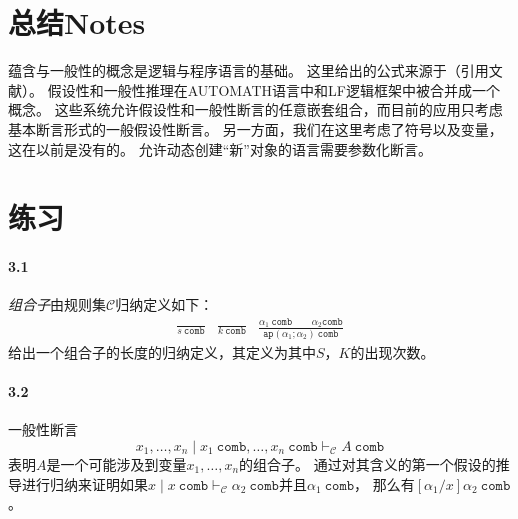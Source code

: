 \section{总结Notes}

蕴含与一般性的概念是逻辑与程序语言的基础。
这里给出的公式来源于（引用文献）。
假设性和一般性推理在AUTOMATH语言中和LF逻辑框架中被合并成一个概念。
这些系统允许假设性和一般性断言的任意嵌套组合，而目前的应用只考虑基本断言形式的一般假设性断言。
另一方面，我们在这里考虑了符号以及变量，这在以前是没有的。
允许动态创建“新”对象的语言需要参数化断言。

\section*{练习}

\paragraph{3.1} 
\textit{组合子}由规则集$\mathcal{C}$归纳定义如下：
\begin{subequations}
    \begin{align}
        \frac{}{s \ \mathtt{comb}} 
    \end{align}
    \begin{align}
        \frac{}{k \ \mathtt{comb}} 
    \end{align}
    \begin{align}
        \frac{\alpha_1 \ \mathtt{comb} \qquad \alpha_2 \mathtt{comb}}{\mathtt{ap}(\alpha_1 ; \alpha_2) \ \mathtt{comb}} 
    \end{align}
\end{subequations}
给出一个组合子的长度的归纳定义，其定义为其中$S$，$K$的出现次数。

\paragraph{3.2} 
一般性断言
$$x_1, \dots, x_n \mid x_1 \ \mathtt{comb}, \dots, x_n \ \mathtt{comb} \vdash_{\mathcal{C}} A \ \mathtt{comb}$$
表明$A$是一个可能涉及到变量$x_1,\dots,x_n$的组合子。
通过对其含义的第一个假设的推导进行归纳来证明如果$x \mid x \ \mathtt{comb} \vdash_{\mathcal{C}} \alpha_2 \ \mathtt{comb}$并且$\alpha_1 \ \mathtt{comb}$，
那么有$[\alpha_1 / x] \alpha_2 \ \mathtt{comb}$。

